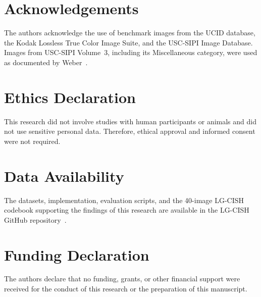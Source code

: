 \documentclass[10pt,a4paper]{article}
\theoremstyle{definition}
\begin{document}
\section*{Acknowledgements}

The authors acknowledge the use of benchmark images from the UCID database, the
Kodak Lossless True Color Image Suite, and the USC-SIPI Image Database. Images
from USC-SIPI Volume~3, including its Miscellaneous category, were used as
documented by Weber~\cite{uscsipi}.

\section*{Ethics Declaration}

This research did not involve studies with human participants or animals and did not use sensitive personal data. Therefore, ethical approval and informed consent were not required.

\section*{Data Availability}

The datasets, implementation, evaluation scripts, and the 40-image LG-CISH
codebook supporting the findings of this research are available in the LG-CISH
GitHub repository~\cite{lgcishGithub}.

\section*{Funding Declaration}

The authors declare that no funding, grants, or other financial support were received for the conduct of this research or the preparation of this manuscript.
\end{document}
